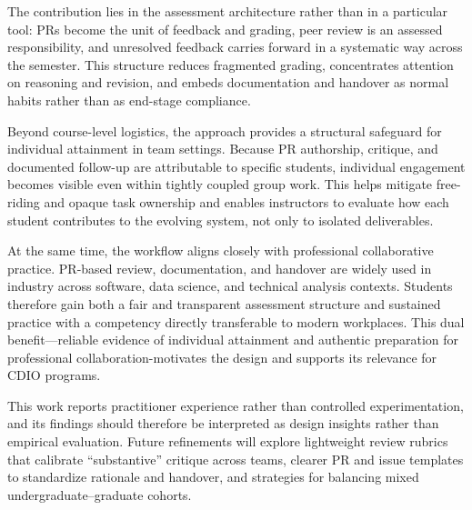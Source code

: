 The contribution lies in the assessment architecture rather than in a particular tool: PRs become the unit of feedback and grading, peer review is an assessed responsibility, and unresolved feedback carries forward in a systematic way across the semester. This structure reduces fragmented grading, concentrates attention on reasoning and revision, and embeds documentation and handover as normal habits rather than as end-stage compliance.

Beyond course-level logistics, the approach provides a structural safeguard for individual attainment in team settings. Because PR authorship, critique, and documented follow-up are attributable to specific students, individual engagement becomes visible even within tightly coupled group work. This helps mitigate free-riding and opaque task ownership and enables instructors to evaluate how each student contributes to the evolving system, not only to isolated deliverables.

At the same time, the workflow aligns closely with professional collaborative practice. PR-based review, documentation, and handover are widely used in industry across software, data science, and technical analysis contexts. Students therefore gain both a fair and transparent assessment structure and sustained practice with a competency directly transferable to modern workplaces. This dual benefit—reliable evidence of individual attainment and authentic preparation for professional collaboration-motivates the design and supports its relevance for CDIO programs.

This work reports practitioner experience rather than controlled experimentation, and its findings should therefore be interpreted as design insights rather than empirical evaluation. Future refinements will explore lightweight review rubrics that calibrate ``substantive'' critique across teams, clearer PR and issue templates to standardize rationale and handover, and strategies for balancing mixed undergraduate–graduate cohorts.
